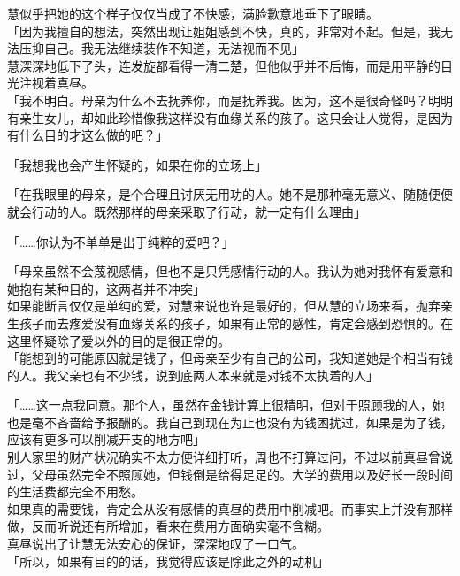 慧似乎把她的这个样子仅仅当成了不快感，满脸歉意地垂下了眼睛。\\

「因为我擅自的想法，突然出现让姐姐感到不快，真的，非常对不起。但是，我无法压抑自己。我无法继续装作不知道，无法视而不见」\\

慧深深地低下了头，连发旋都看得一清二楚，但他似乎并不后悔，而是用平静的目光注视着真昼。\\

「我不明白。母亲为什么不去抚养你，而是抚养我。因为，这不是很奇怪吗？明明有亲生女儿，却如此珍惜像我这样没有血缘关系的孩子。这只会让人觉得，是因为有什么目的才这么做的吧？」

「我想我也会产生怀疑的，如果在你的立场上」

「在我眼里的母亲，是个合理且讨厌无用功的人。她不是那种毫无意义、随随便便就会行动的人。既然那样的母亲采取了行动，就一定有什么理由」

「……你认为不单单是出于纯粹的爱吧？」

「母亲虽然不会蔑视感情，但也不是只凭感情行动的人。我认为她对我怀有爱意和她抱有某种目的，这两者并不冲突」\\

如果能断言仅仅是单纯的爱，对慧来说也许是最好的，但从慧的立场来看，抛弃亲生孩子而去疼爱没有血缘关系的孩子，如果有正常的感性，肯定会感到恐惧的。在这里怀疑除了爱以外的目的是很正常的。\\

「能想到的可能原因就是钱了，但母亲至少有自己的公司，我知道她是个相当有钱的人。我父亲也有不少钱，说到底两人本来就是对钱不太执着的人」

「……这一点我同意。那个人，虽然在金钱计算上很精明，但对于照顾我的人，她也是毫不吝啬给予报酬的。我自己到现在为止也没有为钱困扰过，如果是为了钱，应该有更多可以削减开支的地方吧」\\

别人家里的财产状况确实不太方便详细打听，周也不打算过问，不过以前真昼曾说过，父母虽然完全不照顾她，但钱倒是给得足足的。大学的费用以及好长一段时间的生活费都完全不用愁。\\

如果真的需要钱，肯定会从没有感情的真昼的费用中削减吧。而事实上并没有那样做，反而听说还有所增加，看来在费用方面确实毫不含糊。\\

真昼说出了让慧无法安心的保证，深深地叹了一口气。\\

「所以，如果有目的的话，我觉得应该是除此之外的动机」


